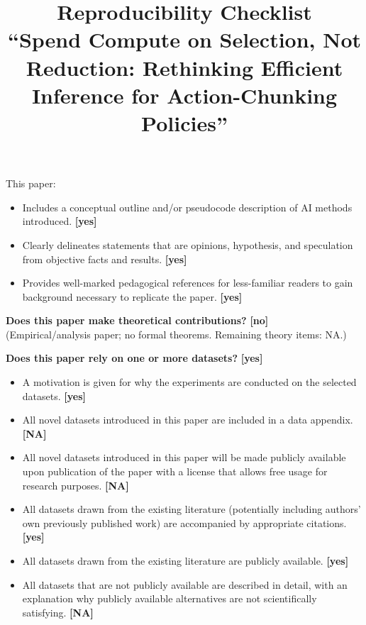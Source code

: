 \documentclass[11pt]{article}
\title{Reproducibility Checklist \\ \large ``Spend Compute on Selection, Not Reduction:
Rethinking Efficient Inference for Action-Chunking Policies''}
\date{}
\newcommand{\ans}[1]{\textbf{[#1]}}
\begin{document}
\maketitle

\noindent This paper:
\begin{itemize}
  \item Includes a conceptual outline and/or pseudocode description of AI methods
        introduced. \ans{yes}
  \item Clearly delineates statements that are opinions, hypothesis, and speculation
        from objective facts and results. \ans{yes}
  \item Provides well-marked pedagogical references for less-familiar readers to gain
        background necessary to replicate the paper. \ans{yes}
\end{itemize}

\noindent\textbf{Does this paper make theoretical contributions?} \ans{no}
\\(Empirical/analysis paper; no formal theorems. Remaining theory items: NA.)

\bigskip
\noindent\textbf{Does this paper rely on one or more datasets?} \ans{yes}
\begin{itemize}
  \item A motivation is given for why the experiments are conducted on the selected
        datasets. \ans{yes}
  \item All novel datasets introduced in this paper are included in a data appendix. \ans{NA}
  \item All novel datasets introduced in this paper will be made publicly available upon
        publication of the paper with a license that allows free usage for research
        purposes. \ans{NA}
  \item All datasets drawn from the existing literature (potentially including authors'
        own previously published work) are accompanied by appropriate citations. \ans{yes}
  \item All datasets drawn from the existing literature are publicly available. \ans{yes}
  \item All datasets that are not publicly available are described in detail, with an
        explanation why publicly available alternatives are not scientifically
        satisfying. \ans{NA}
\end{itemize}
\end{document}

